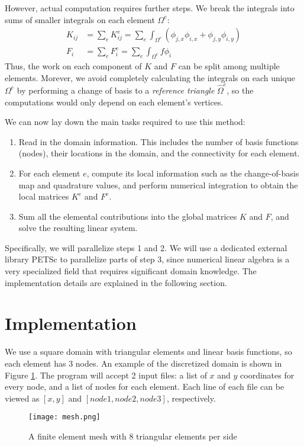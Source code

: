 \documentclass[12pt,notitlepage]{extreport}
\begin{document}
However, actual computation requires further steps. We break the integrals into sums of smaller integrals on each element $\Omega^e$:
\begin{align}
  K_{ij} &= \sum_e K^e_{ij} = \sum_e \int_{\Omega^e} (\phi_{j,x} \phi_{i,x} + \phi_{j,y} \phi_{i,y}) \\
  F_i &= \sum_e F^e_i = \sum_e \int_{\Omega^e} f \phi_i
\end{align}
Thus, the work on each component of $K$ and $F$ can be split among multiple elements. Morever, we avoid completely calculating the integrals on each unique $\Omega^e$ by performing a change of basis to a \textit{reference triangle} $\hat{\Omega}^e$, so the computations would only depend on each element's vertices.

We can now lay down the main tasks required to use this method:
\begin{enumerate}
\item Read in the domain information. This includes the number of basis functions (nodes), their locations in the domain, and the connectivity for each element.
\item For each element $e$, compute its local information such as the change-of-basis map and quadrature values, and perform numerical integration to obtain the local matrices $K^e$ and $F^e$.
\item Sum all the elemental contributions into the global matrices $K$ and $F$, and solve the resulting linear system.
\end{enumerate}
Specifically, we will parallelize steps 1 and 2. We will use a dedicated external library PETSc to parallelize parts of step 3, since numerical linear algebra is a very specialized field that requires significant domain knowledge. The implementation details are explained in the following section.

\section*{Implementation}
We use a square domain with triangular elements and linear basis functions, so each element has 3 nodes. An example of the discretized domain is shown in Figure \ref{fig:mesh}. The program will accept 2 input files: a list of $x$ and $y$ coordinates for every node, and a list of nodes for each element. Each line of each file can be viewed as $[x, y]$ and $[node1, node2, node3]$, respectively.
\begin{figure}[h]
  \centering
  \texttt{[image: mesh.png]}
  \caption{A finite element mesh with 8 triangular elements per side}
  \label{fig:mesh}
\end{figure}
\end{document}
